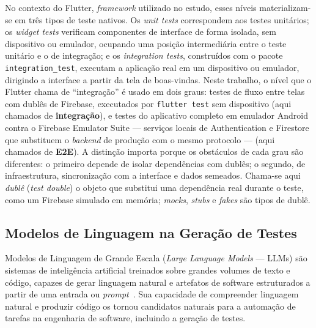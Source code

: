 \documentclass[12pt]{article}
\begin{document}
No contexto do Flutter, \textit{framework} utilizado no estudo, esses
níveis materializam-se em três tipos de teste nativos. Os \textit{unit tests}
correspondem aos testes unitários; os \textit{widget tests} verificam
componentes de interface de forma isolada, sem dispositivo ou emulador,
ocupando uma posição intermediária entre o teste unitário e o de integração;
e os \textit{integration tests}, construídos com o pacote
\texttt{integration\_test}, executam a aplicação real em um dispositivo ou
emulador, dirigindo a interface a partir da tela de boas-vindas. Neste trabalho, o
nível que o Flutter chama de ``integração'' é usado em dois graus: testes de
fluxo entre telas com dublês de Firebase, executados por \texttt{flutter
test} sem dispositivo (aqui chamados de \textbf{integração}), e testes do
aplicativo completo em emulador Android contra o Firebase Emulator Suite ---
serviços locais de Authentication e Firestore que substituem o
\textit{backend} de produção com o mesmo protocolo --- (aqui chamados de
\textbf{E2E}). A distinção importa porque os obstáculos de cada grau são
diferentes: o primeiro depende de isolar dependências com dublês; o segundo,
de infraestrutura, sincronização com a interface e dados semeados.
Chama-se aqui \emph{dublê} (\textit{test double}) o objeto que substitui uma
dependência real durante o teste, como um Firebase simulado em memória;
\textit{mocks}, \textit{stubs} e \textit{fakes} são tipos de dublê.

\subsection{Modelos de Linguagem na Geração de Testes}
\label{subsec:llms}

Modelos de Linguagem de Grande Escala (\textit{Large Language Models} ---
LLMs) são sistemas de inteligência artificial treinados sobre grandes volumes
de texto e código, capazes de gerar linguagem natural e artefatos de software
estruturados a partir de uma entrada ou \textit{prompt}~\cite{wang2024survey}.
Sua capacidade de compreender linguagem natural e produzir código os tornou
candidatos naturais para a automação de tarefas na engenharia de software,
incluindo a geração de testes.
\end{document}

